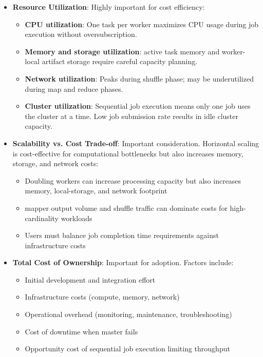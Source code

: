 \documentclass{scrartcl}
\begin{document}
\begin{itemize}
    \item \textbf{Resource Utilization}: Highly important for cost efficiency:
          \begin{itemize}
              \item \textbf{CPU utilization}: One task per worker maximizes CPU usage during job execution without oversubscription.
              \item \textbf{Memory and storage utilization}: active task memory and worker-local artifact storage require careful capacity planning.
              \item \textbf{Network utilization}: Peaks during shuffle phase; may be underutilized during map and reduce phases.
              \item \textbf{Cluster utilization}: Sequential job execution means only one job uses the cluster at a time. Low job submission rate results in idle cluster capacity.
          \end{itemize}

    \item \textbf{Scalability vs. Cost Trade-off}: Important consideration. Horizontal scaling is cost-effective for computational bottlenecks but also increases memory, storage, and network costs:
          \begin{itemize}
              \item Doubling workers can increase processing capacity but also increases memory, local-storage, and network footprint
              \item mapper output volume and shuffle traffic can dominate costs for high-cardinality workloads
              \item Users must balance job completion time requirements against infrastructure costs
          \end{itemize}

    \item \textbf{Total Cost of Ownership}: Important for adoption. Factors include:
          \begin{itemize}
              \item Initial development and integration effort
              \item Infrastructure costs (compute, memory, network)
              \item Operational overhead (monitoring, maintenance, troubleshooting)
              \item Cost of downtime when master fails
              \item Opportunity cost of sequential job execution limiting throughput
          \end{itemize}
\end{itemize}
\end{document}
